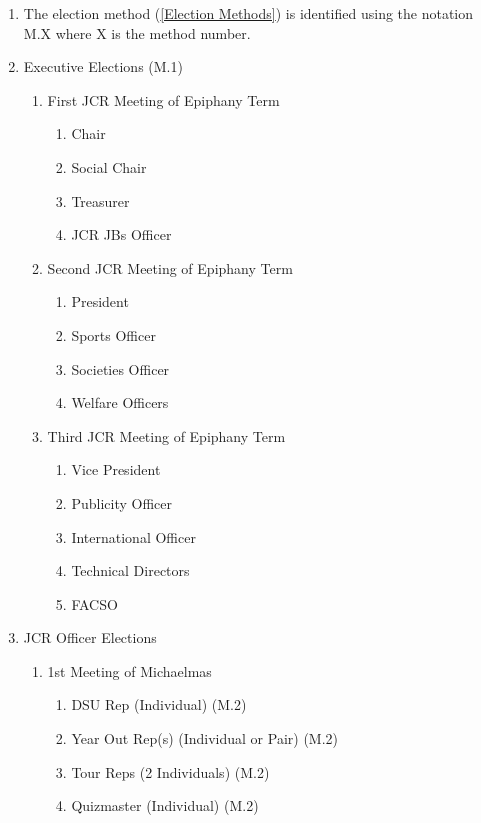 \begin{enumerate}
    \item The election method (\ref{Election Methods}) is identified using the notation M.X where X is the method number.
    \item Executive Elections (M.1)
    \begin{enumerate}
        \item First JCR Meeting of Epiphany Term
        \begin{enumerate}
            \item Chair
            \item Social Chair 
            \item Treasurer 
            \item JCR JBs Officer
        \end{enumerate}
        \item Second JCR Meeting of Epiphany Term
        \begin{enumerate}
            \item President
            \item Sports Officer 
            \item Societies Officer 
            \item Welfare Officers
        \end{enumerate}
        \item Third JCR Meeting of Epiphany Term
        \begin{enumerate}
            \item Vice President 
            \item Publicity Officer 
            \item International Officer 
            \item Technical Directors
            \item FACSO
        \end{enumerate}
    \end{enumerate}
    \item JCR Officer Elections
    \begin{enumerate}
        \item 1st Meeting of Michaelmas
        \begin{enumerate}
            \item DSU Rep (Individual) (M.2)
            \item Year Out Rep(s) (Individual or Pair) (M.2)
            \item Tour Reps (2 Individuals) (M.2)
            \item Quizmaster (Individual) (M.2)

\end{enumerate}
\end{enumerate}
\end{enumerate}
